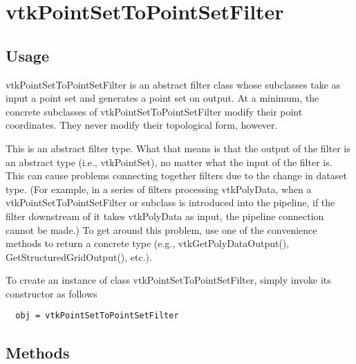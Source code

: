 \section{vtkPointSetToPointSetFilter}

\subsection{Usage}

 vtkPointSetToPointSetFilter is an abstract filter class whose subclasses
 take as input a point set and generates a point set on output.  At a
 minimum, the concrete subclasses of vtkPointSetToPointSetFilter modify
 their point coordinates. They never modify their topological form,
 however.

 This is an abstract filter type. What that means is that the output of the
 filter is an abstract type (i.e., vtkPointSet), no matter what the input
 of the filter is. This can cause problems connecting together filters due
 to the change in dataset type. (For example, in a series of filters
 processing vtkPolyData, when a vtkPointSetToPointSetFilter or subclass is
 introduced into the pipeline, if the filter downstream of it takes
 vtkPolyData as input, the pipeline connection cannot be made.) To get
 around this problem, use one of the convenience methods to return a
 concrete type (e.g., vtkGetPolyDataOutput(), GetStructuredGridOutput(),
 etc.).

To create an instance of class vtkPointSetToPointSetFilter, simply
invoke its constructor as follows
\begin{verbatim}
  obj = vtkPointSetToPointSetFilter
\end{verbatim}
\subsection{Methods}

